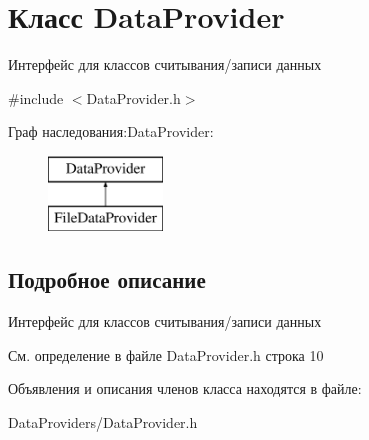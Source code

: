 \hypertarget{class_data_provider}{}\section{Класс Data\+Provider}
\label{class_data_provider}


Интерфейс для классов считывания/записи данных  




{\ttfamily \#include $<$Data\+Provider.\+h$>$}

Граф наследования\+:Data\+Provider\+:\begin{figure}[H]
\begin{center}
\leavevmode
\includegraphics[height=2.000000cm]{class_data_provider}
\end{center}
\end{figure}


\subsection{Подробное описание}
Интерфейс для классов считывания/записи данных 

См. определение в файле Data\+Provider.\+h строка 10



Объявления и описания членов класса находятся в файле\+:\begin{DoxyCompactItemize}
\item 
Data\+Providers/Data\+Provider.\+h\end{DoxyCompactItemize}
